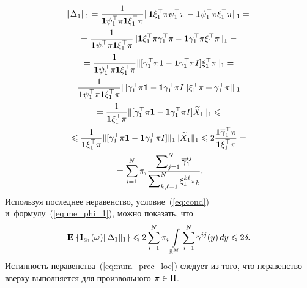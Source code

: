 \begin{multicols}{2}
{ \noindent
\begin{multline*}
\|\Delta_1\|_1 = \displaystyle\frac{\displaystyle 1\mathstrut}{\displaystyle \mathbf{1}\psi_1^{\top}\pi \mathbf{1}\xi_1^{\top}\pi\mathstrut}
\|
\mathbf{1}\xi_1^{\top}\pi \psi_1^{\top}\pi-
\mathbf{1}\psi_1^{\top}\pi\xi_1^{\top}\pi
\|_1 = {}\\
{}=
\displaystyle\frac{\displaystyle 1\mathstrut}{\displaystyle \mathbf{1}\psi_1^{\top}\pi \mathbf{1}\xi_1^{\top}\pi\mathstrut}
\|
\mathbf{1}\xi_1^{\top}\pi \gamma_1^{\top}\pi-
\mathbf{1}\gamma_1^{\top}\pi\xi_1^{\top}\pi
\|_1 ={} \\
{} =
\displaystyle\frac{\displaystyle 1\mathstrut}{\displaystyle \mathbf{1}\psi_1^{\top}\pi \mathbf{1}\xi_1^{\top}\pi\mathstrut}
\|[
\gamma_1^{\top}\pi \mathbf{1}-
\mathbf{1}\gamma_1^{\top}\pi I 
]\xi_1^{\top}\pi
\|_1 ={} \\ 
{}=
\displaystyle\frac{\displaystyle 1\mathstrut}{\displaystyle \mathbf{1}\psi_1^{\top}\pi \mathbf{1}\xi_1^{\top}\pi\mathstrut}
\|[
\gamma_1^{\top}\pi \mathbf{1}-
\mathbf{1}\gamma_1^{\top}\pi I 
][\xi_1^{\top}\pi + \gamma_1^{\top}\pi]
\|_1 = {}\\
{}=\displaystyle\frac{\displaystyle 1\mathstrut}{\displaystyle \mathbf{1}\xi_1^{\top}\pi\mathstrut}
\|
[
\gamma_1^{\top}\pi \mathbf{1}-
\mathbf{1}\gamma_1^{\top}\pi I 
]\widetilde{X}_1
\|_1
\leqslant{} \\
{}\leqslant
\displaystyle\frac{\displaystyle 1\mathstrut}{\displaystyle \mathbf{1}\xi_1^{\top}\pi\mathstrut}
\|
[
\gamma_1^{\top}\pi \mathbf{1}-
\mathbf{1}\gamma_1^{\top}\pi I 
]\|_1 \|\widetilde{X}_1
\|_1 \leqslant 2\displaystyle\frac{\displaystyle \mathbf{1}\overline{\gamma}_1^{\top}\pi\mathstrut}{\displaystyle \mathbf{1}\xi_1^{\top}\pi\mathstrut} ={}\\
{}= \sum\limits_{i=1}^N\pi_i
\displaystyle\frac{\displaystyle \sum\nolimits_{j=1}^N \overline{\gamma}_1^{ij}\mathstrut}{\displaystyle \sum\nolimits_{k,\ell=1}^N \xi_1^{k\ell}\pi_k\mathstrut}.
\end{multline*}
Используя последнее неравенство,  условие~(\ref{eq:cond}) и~формулу~(\ref{eq:me_phi_1}), можно показать, что
$$
\mathbf{E}_{  }\left\{ \mathop{\mathbf{I}_{a_1}(\omega)\|\Delta_1\|_1} \right\} \leqslant
2 \sum\limits_{i=1}^N \pi_i\int\limits_{\mathbb{R}^M}\sum_{i=1}^N 
\overline{\gamma}^{ij}(y)\,dy
\leqslant 2\delta.
$$
Истинность неравенства~(\ref{eq:num_prec_loc}) следует из того, 
что неравенство вверху выполняется для произвольного $\pi \hm\in \Pi$.

}
\end{multicols}
